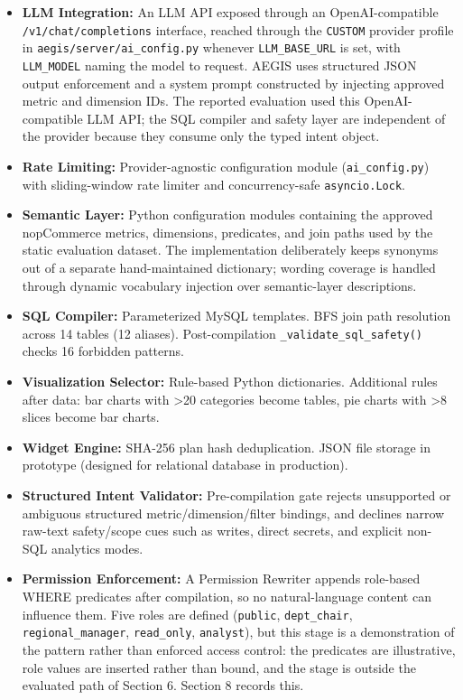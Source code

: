 \documentclass[pdflatex,sn-mathphys-num]{sn-jnl}
\begin{document}
\begin{itemize}
\item \textbf{LLM Integration:} An LLM API exposed through an OpenAI-compatible \texttt{/v1/chat/completions} interface, reached through the \texttt{CUSTOM} provider profile in \texttt{aegis/server/ai\_config.py} whenever \texttt{LLM\_BASE\_URL} is set, with \texttt{LLM\_MODEL} naming the model to request. AEGIS uses structured JSON output enforcement and a system prompt constructed by injecting approved metric and dimension IDs. The reported evaluation used this OpenAI-compatible LLM API; the SQL compiler and safety layer are independent of the provider because they consume only the typed intent object.
\item \textbf{Rate Limiting:} Provider-agnostic configuration module (\texttt{ai\_config.py}) with sliding-window rate limiter and concurrency-safe \texttt{asyncio.Lock}.
\item \textbf{Semantic Layer:} Python configuration modules containing the approved nopCommerce metrics, dimensions, predicates, and join paths used by the static evaluation dataset. The implementation deliberately keeps synonyms out of a separate hand-maintained dictionary; wording coverage is handled through dynamic vocabulary injection over semantic-layer descriptions.
\item \textbf{SQL Compiler:} Parameterized MySQL templates. BFS join path resolution across 14 tables (12 aliases). Post-compilation \texttt{\_validate\_sql\_safety()} checks 16 forbidden patterns.
\item \textbf{Visualization Selector:} Rule-based Python dictionaries. Additional rules after data: bar charts with >20 categories become tables, pie charts with >8 slices become bar charts.
\item \textbf{Widget Engine:} SHA-256 plan hash deduplication. JSON file storage in prototype (designed for relational database in production).
\item \textbf{Structured Intent Validator:} Pre-compilation gate rejects unsupported or ambiguous structured metric/dimension/filter bindings, and declines narrow raw-text safety/scope cues such as writes, direct secrets, and explicit non-SQL analytics modes.
\item \textbf{Permission Enforcement:} A Permission Rewriter appends role-based WHERE predicates after compilation, so no natural-language content can influence them. Five roles are defined (\texttt{public}, \texttt{dept\_chair}, \texttt{regional\_manager}, \texttt{read\_only}, \texttt{analyst}), but this stage is a demonstration of the pattern rather than enforced access control: the predicates are illustrative, role values are inserted rather than bound, and the stage is outside the evaluated path of Section 6. Section 8 records this.
\end{itemize}
\end{document}
